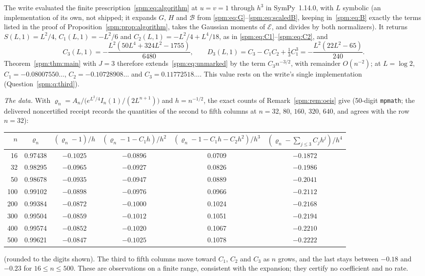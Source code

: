 \begin{remark}[{[write]} The third coefficient at $u=v=1$, and the data, 6~October 2026]\label{spm:rem:third}
The write evaluated the finite prescription~\eqref{spm:eq:algorithm} at
$u=v=1$ through $h^3$ in SymPy~1.14.0, with $L$ symbolic (an implementation
of its own, not shipped; it expands $G$, $H$ and $\mathcal B$ from
\eqref{spm:eq:G}--\eqref{spm:eq:scaledB}, keeping in~\eqref{spm:eq:B}
exactly the terms listed in the proof of
Proposition~\ref{spm:prop:algorithm}, takes the Gaussian moments of
$\mathcal E$, and divides by both normalizers). It returns $S(L,1)=L^2/4$,
$C_1(L,1)=-L^2/6$ and $C_2(L,1)=-L^2/4+L^4/18$, as in
\eqref{spm:eq:C1}--\eqref{spm:eq:C2}, and
\[
 C_3(L,1)=-\frac{L^2(50L^4+324L^2-1755)}{6480},\qquad
 D_3(L,1)=C_3-C_1C_2+\tfrac13C_1^3=-\frac{L^2(22L^2-65)}{240}.
\]
Theorem~\ref{spm:thm:main} with $J=3$ therefore extends~\eqref{spm:eq:unmarked}
by the term $C_3n^{-3/2}$, with remainder $O(n^{-2})$; at $L=\log2$,
$C_1=-0.08007550\ldots$, $C_2=-0.10728908\ldots$ and
$C_3=0.11772518\ldots$. This value rests on the write's single
implementation (Question~\ref{spm:q:third}).

\emph{The data.} With $\varrho_n=A_n\big/\bigl(e^{L^2/4}I_n(1)/(2L^{n+1})\bigr)$
and $h=n^{-1/2}$, the exact counts of Remark~\ref{spm:rem:oeis} give
(50-digit \texttt{mpmath}; the delivered noncertified receipt
 records the quantities of the second to fifth columns at
$n=32$, $80$, $160$, $320$, $640$, and agrees with the row $n=32$):
\begin{center}\small
\begin{tabular}{@{}r*{5}{c}@{}}
\toprule
$n$ & $\varrho_n$ & $(\varrho_n-1)/h$ & $(\varrho_n-1-C_1h)/h^2$ & $(\varrho_n-1-C_1h-C_2h^2)/h^3$ & $(\varrho_n-\sum_{j\le3}C_jh^j)/h^4$\\
\midrule
16 & 0.97438 & $-0.1025$ & $-0.0896$ & 0.0709 & $-0.1872$\\
32 & 0.98295 & $-0.0965$ & $-0.0927$ & 0.0826 & $-0.1986$\\
50 & 0.98678 & $-0.0935$ & $-0.0947$ & 0.0889 & $-0.2041$\\
100 & 0.99102 & $-0.0898$ & $-0.0976$ & 0.0966 & $-0.2112$\\
200 & 0.99384 & $-0.0872$ & $-0.1000$ & 0.1024 & $-0.2168$\\
300 & 0.99504 & $-0.0859$ & $-0.1012$ & 0.1051 & $-0.2194$\\
400 & 0.99574 & $-0.0852$ & $-0.1020$ & 0.1067 & $-0.2210$\\
500 & 0.99621 & $-0.0847$ & $-0.1025$ & 0.1078 & $-0.2222$\\
\bottomrule
\end{tabular}
\end{center}
(rounded to the digits shown). The third to fifth columns move toward
$C_1$, $C_2$ and $C_3$ as $n$ grows, and the last stays between $-0.18$
and $-0.23$ for $16\le n\le500$. These are observations on a finite range,
consistent with the expansion; they certify no coefficient and no rate.
\end{remark}
